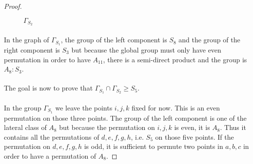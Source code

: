 \begin{proof}
\begin{figure}[H]
\begin{center}
      \caption{$\Gamma_{S_2}$}
    \end{center}
  \end{figure}

  \paragraph{}
  In the graph of $\Gamma_{S_1}$, the group of the left component is $S_8$ and the group of the right component is $S_3$ but because the global group must only have even permutation in order to have $A_{11}$, there is a semi-direct product and the group is $A_8 : S_3$.

  \paragraph{}
  The goal is now to prove that $\Gamma_{S_1} \cap \Gamma_{S_2} \ge S_5$.

  \paragraph{}
  In the group $\Gamma_{S_1}$ we leave the points $i,j,k$ fixed for now. This is an even permutation on those three points. The group of the left component is one of the lateral class of $A_8$ but because the permutation on $i,j,k$ is even, it is $A_8$. Thus it contains all the permutations of $d,e,f,g,h$, i.e. $S_5$ on those five points. If the permutation on $d,e,f,g,h$ is odd, it is sufficient to permute two points in $a,b,c$ in order to have a permutation of $A_8$.


\end{proof}
